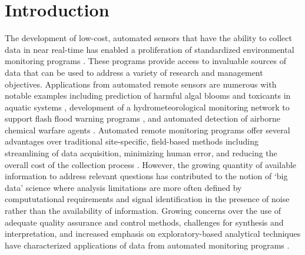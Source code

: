 \documentclass[10pt,letterpaper]{article}\usepackage[]{graphicx}\usepackage[]{color}
\begin{document}
\linenumbers

\section*{Introduction}

The development of low-cost, automated sensors that have the ability to collect data in near real-time has enabled a proliferation of standardized environmental monitoring programs \cite{Glasgow04,Fries08}.  These programs provide access to invaluable sources of data that can be used to address a variety of research and management objectives.  Applications from automated remote sensors are numerous with notable examples including prediction of harmful algal blooms and toxicants in aquatic systems \cite{Reed10}, development of a hydrometeorological monitoring network to support flash flood warning programs \cite{HADS15}, and automated detection of airborne chemical warfare agents \cite{Sanders01}.  Automated remote monitoring programs offer several advantages over traditional site-specific, field-based methods including streamlining of data acquisition, minimizing human error, and reducing the overall cost of the collection process \cite{Glasgow04}.  However, the growing quantity of available information to address relevant questions has contributed to the notion of `big data' science where analysis limitations are more often defined by compututational requirements and signal identification in the presence of noise rather than the availability of information.  Growing concerns over the use of adequate quality assurance and control methods, challenges for synthesis and interpretation, and increased emphasis on exploratory-based analytical techniques have characterized applications of data from automated monitoring programs \cite{Campbell13,Millie13}.
\end{document}
